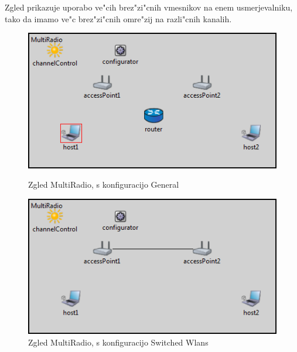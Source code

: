 \documentclass[a4paper,11pt]{article}
\begin{document}
Zgled prikazuje uporabo ve"cih brez"zi"cnih vmesnikov na enem usmerjevalniku, tako da imamo ve"c brez"zi"cnih omre"zij na razli"cnih kanalih.


\begin{figure}[htbp]
    \begin{center}
        \includegraphics[scale=0.8]{img/zgledi/multiradio_general.png}
        \label{image:multiradiogeneral}
        \caption{Zgled MultiRadio, s konfiguracijo General}
    \end{center}
\end{figure}

\begin{figure}[htbp]
    \begin{center}
        \includegraphics[scale=0.8]{img/zgledi/multiradio_switched.png}
        \caption{Zgled MultiRadio, s konfiguracijo Switched Wlans}
        \label{image:multiradioswitched}
    \end{center}
\end{figure}
\end{document}

